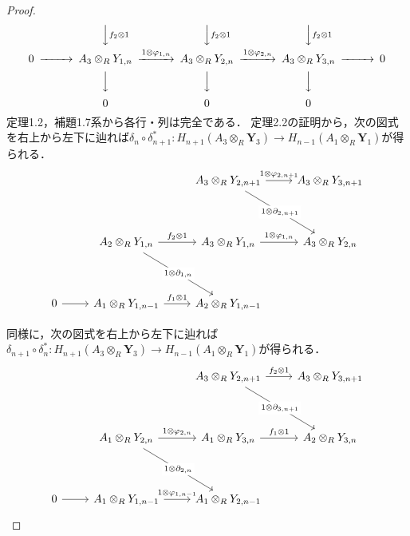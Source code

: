 \begin{proof}
\[\begin{CD}
    @. @VV{f_2 \otimes 1}V @VV{f_2 \otimes 1}V @VV{f_2 \otimes 1}V \\
    0 @>>> A_3 \otimes_R Y_{1, n} @>{1 \otimes \varphi_{1, n}}>> A_3 \otimes_R Y_{2, n} @>{1 \otimes \varphi_{2, n}}>> A_3 \otimes_R Y_{3, n} @>>> 0 \\
    @. @VVV @VVV @VVV \\
    @. 0 @. 0 @. 0
  \end{CD}
  \]
  定理1.2，補題1.7系から各行・列は完全である．
  定理2.2の証明から，次の図式を右上から左下に辿れば$\delta_n \circ \delta_{n+1}^\ast \colon H_{n+1}(A_3 \otimes_R \boldsymbol{Y}_3) \to H_{n-1}(A_1 \otimes_R \boldsymbol{Y}_1)$が得られる．
  \[
  \begin{tikzcd}
    & & A_3 \otimes_R Y_{2, n+1} \arrow[r,"1 \otimes \varphi_{2, n+1}"]\arrow[rd, "1 \otimes \partial_{2, n+1}" description] & A_3 \otimes_R Y_{3, n+1} \\[20pt]
    & A_2 \otimes_R Y_{1, n} \arrow[r, "f_2 \otimes 1"]\arrow[rd, "1 \otimes \partial_{1, n}" description] & A_3 \otimes_R Y_{1, n} \arrow[r, "1 \otimes \varphi_{1, n}"] & A_3 \otimes_R Y_{2, n} \\[20pt]
    0 \arrow[r] & A_1 \otimes_R Y_{1, n-1} \arrow[r, "f_1 \otimes 1"] & A_2 \otimes_R Y_{1, n-1}
  \end{tikzcd}
  \]

  同様に，次の図式を右上から左下に辿れば$\delta_{n+1} \circ \delta_n^\ast \colon H_{n+1}(A_3 \otimes_R \boldsymbol{Y}_3) \to H_{n-1}(A_1 \otimes_R \boldsymbol{Y}_1)$が得られる．
  \[
  \begin{tikzcd}
    & & A_3 \otimes_R Y_{2, n+1} \arrow[r,"f_2 \otimes 1"]\arrow[rd, "1 \otimes \partial_{3, n+1}" description] & A_3 \otimes_R Y_{3, n+1} \\[20pt]
    & A_1 \otimes_R Y_{2, n} \arrow[r, "1 \otimes \varphi_{2, n}"]\arrow[rd, "1 \otimes \partial_{2, n}" description] & A_1 \otimes_R Y_{3, n} \arrow[r, "f_1 \otimes 1"] & A_2 \otimes_R Y_{3, n} \\[20pt]
    0 \arrow[r] & A_1 \otimes_R Y_{1, n-1} \arrow[r, "1 \otimes \varphi_{1, n-1}"] & A_1 \otimes_R Y_{2, n-1}
  \end{tikzcd}
  \]


\end{proof}
